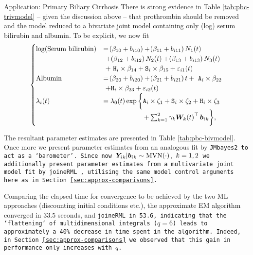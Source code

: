 \begin{chapter}{\label{cha:app-PBC}Application: Primary Biliary Cirrhosis}
  There is strong evidence in Table \ref{tab:pbc-trivmodel} -- given the discussion above -- that prothrombin should be removed and the model reduced to a bivariate joint model containing only (log) serum bilirubin and albumin. To be explicit, we now fit
  \begin{equation}
    \begin{aligned}
    \begin{cases}
        \log\lb\mathrm{Serum\ bilirubin}\rb &= \lb\beta_{10} + b_{i10}\rb + \lb\beta_{11} + b_{i11}\rb N_1(t) \\&\ + \lb\beta_{12} + b_{i12}\rb N_2(t) + \lb\beta_{13} + b_{i13}\rb N_3(t)\\&\ +\ \tt{H}_i\times\beta_{14} + \tt{S}_i\times\beta_{15} + \varepsilon_{i1}\lb t\rb\\
        \mathrm{Albumin} &= \lb\beta_{20} + b_{i20}\rb + \lb\beta_{21} + b_{i21}\rb t +\ \tt{A}_i\times\beta_{22} \\&\ + \tt{H}_i\times\beta_{23} + \varepsilon_{i2}\lb t\rb \\
        \li\lb t\rb &= \lo\lb t\rb \exp\bigg\{\tt{A}_i\times\zeta_1+\tt{S}_i\times\zeta_2+\tt{H}_i\times\zeta_3\\&\qquad\qquad\qquad +\sum_{k=1}^2\gamma_k\bm{W}_k\lb t\rb^\top\b{_k}\bigg\},
    \end{cases}       
    \end{aligned}
    \label{eq:pbc-bivariate}
  \end{equation}  

  The resultant parameter estimates are presented in Table \ref{tab:pbc-bivmodel}. Once more we present parameter estimates from an analogous fit by \tt{JMbayes2} to act as a `barometer'. Since now $\bm{Y}_i{_k}|\bm{b}_i{_k}\sim\mathrm{MVN}\!\left(\cdot\right),\ k=1,2$ we additionally present parameter estimates from a multivariate joint model fit by \tt{joineRML} \citep{Hickey2018}, utilising the same model control arguments here as in Section \ref{sec:approx-comparisons}. 
  
  Comparing the elapsed time for convergence to be achieved by the two ML approaches (\ie discounting initial conditions etc.), the approximate EM algorithm converged in 33.5 seconds, and \tt{joineRML} in 53.6, indicating that the `flattening' of multidimensional integrals ($q=6$) leads to approximately a 40\% decrease in time spent in the algorithm. Indeed, in Section \ref{sec:approx-comparisons} we observed that this gain in performance only increases with $q$. 


\end{chapter}
